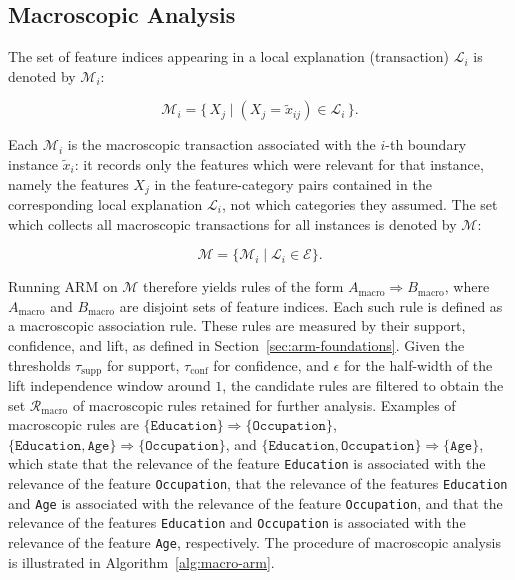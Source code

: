 \subsection{Macroscopic Analysis}

The set of feature indices appearing in a local explanation (transaction) $\mathcal{L}_i$ is denoted by $\mathcal{M}_i$:

\begin{equation}
  \mathcal{M}_i = \{\, X_j \mid (X_j = \tilde{x}_{ij}) \in \mathcal{L}_i \,\}.
\end{equation}

Each $\mathcal{M}_i$ is the macroscopic transaction associated with the $i$-th boundary instance $\tilde{x}_i$: it records only the features which were relevant for that instance, namely the features $X_j$ in the feature-category pairs contained in the corresponding local explanation $\mathcal{L}_i$, not which categories they assumed. The set which collects all macroscopic transactions for all instances is denoted by $\mathcal{M}$:

\begin{equation}
  \mathcal{M} = \{\mathcal{M}_i \mid \mathcal{L}_i \in \mathcal{E}\}.
\end{equation}

Running ARM on $\mathcal{M}$ therefore yields rules of the form $A_{\mathrm{macro}} \Rightarrow B_{\mathrm{macro}}$, where $A_{\mathrm{macro}}$ and $B_{\mathrm{macro}}$ are disjoint sets of feature indices. Each such rule is defined as a macroscopic association rule. These rules are measured by their support, confidence, and lift, as defined in Section~\ref{sec:arm-foundations}. Given the thresholds $\tau_{\mathrm{supp}}$ for support, $\tau_{\mathrm{conf}}$ for confidence, and $\epsilon$ for the half-width of the lift independence window around $1$, the candidate rules are filtered to obtain the set $\mathcal{R}_{\mathrm{macro}}$ of macroscopic rules retained for further analysis. Examples of macroscopic rules are $\{\texttt{Education}\} \Rightarrow \{\texttt{Occupation}\}$, $\{\texttt{Education}, \texttt{Age}\} \Rightarrow \{\texttt{Occupation}\}$, and $\{\texttt{Education}, \texttt{Occupation}\} \Rightarrow \{\texttt{Age}\}$, which state that the relevance of the feature \texttt{Education} is associated with the relevance of the feature \texttt{Occupation}, that the relevance of the features \texttt{Education} and \texttt{Age} is associated with the relevance of the feature \texttt{Occupation}, and that the relevance of the features \texttt{Education} and \texttt{Occupation} is associated with the relevance of the feature \texttt{Age}, respectively. The procedure of macroscopic analysis is illustrated in Algorithm~\ref{alg:macro-arm}.

